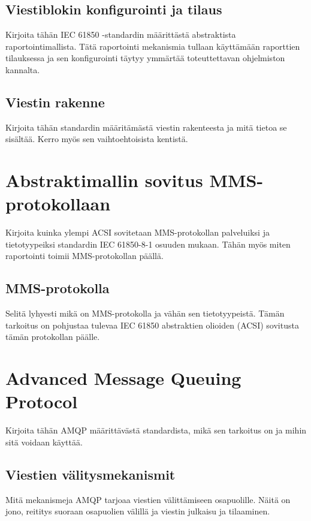 \subsection{Viestiblokin konfigurointi ja tilaus}
\begin{it}
	Kirjoita tähän IEC 61850 -standardin määrittästä abstraktista raportointimallista. Tätä raportointi mekanismia tullaan käyttämään raporttien tilauksessa ja sen konfigurointi täytyy ymmärtää toteuttettavan ohjelmiston kannalta.
\end{it}

\subsection{Viestin rakenne}
\begin{it}
	Kirjoita tähän standardin määritämästä viestin rakenteesta ja mitä tietoa se sisältää. Kerro myös sen vaihtoehtoisista kentistä.
\end{it}

\section{Abstraktimallin sovitus MMS-protokollaan}
\begin{it}
	Kirjoita kuinka ylempi ACSI sovitetaan MMS-protokollan palveluiksi ja tietotyypeiksi standardin IEC 61850-8-1 osuuden mukaan. Tähän myös miten raportointi toimii MMS-protokollan päällä.
\end{it}

\subsection{MMS-protokolla}
\begin{it}
	Selitä lyhyesti mikä on MMS-protokolla ja vähän sen tietotyypeistä. Tämän tarkoitus on pohjustaa tulevaa IEC 61850 abstraktien olioiden (ACSI) sovitusta tämän protokollan päälle.
\end{it}

\section{Advanced Message Queuing Protocol}
\begin{it}
	Kirjoita tähän AMQP määrittävästä standardista, mikä sen tarkoitus on ja mihin sitä voidaan käyttää.
\end{it}

\subsection{Viestien välitysmekanismit}
\begin{it}
	Mitä mekanismeja AMQP tarjoaa viestien välittämiseen osapuolille. Näitä on jono, reititys suoraan osapuolien välillä ja viestin julkaisu ja tilaaminen.
\end{it}

